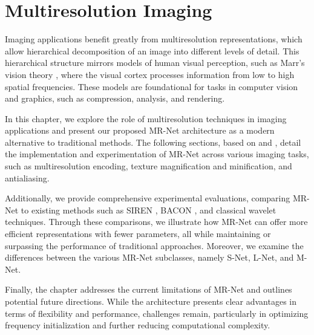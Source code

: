 \chapter{Multiresolution Imaging}
\label{ch:imaging}

Imaging applications benefit greatly from multiresolution representations, which allow hierarchical decomposition of an image into different levels of detail. This hierarchical structure mirrors models of human visual perception, such as Marr's vision theory \citep{marr82}, where the visual cortex processes information from low to high spatial frequencies. These models are foundational for tasks in computer vision and graphics, such as compression, analysis, and rendering.


In this chapter, we explore the role of multiresolution techniques in imaging applications and present our proposed MR-Net architecture as a modern alternative to traditional methods. The following sections, based on \citet{paz2022} and \citet{paz2023mr}, detail the implementation and experimentation of MR-Net across various imaging tasks, such as multiresolution encoding, texture magnification and minification, and antialiasing.

Additionally, we provide comprehensive experimental evaluations, comparing MR-Net to existing methods such as SIREN \citep{sitzmann2019siren}, BACON \citep{bacon2021}, and classical wavelet techniques. Through these comparisons, we illustrate how MR-Net can offer more efficient representations with fewer parameters, all while maintaining or surpassing the performance of traditional approaches. Moreover, we examine the differences between the various MR-Net subclasses, namely S-Net, L-Net, and M-Net.

Finally, the chapter addresses the current limitations of MR-Net and outlines potential future directions. While the architecture presents clear advantages in terms of flexibility and performance, challenges remain, particularly in optimizing frequency initialization and further reducing computational complexity. 


